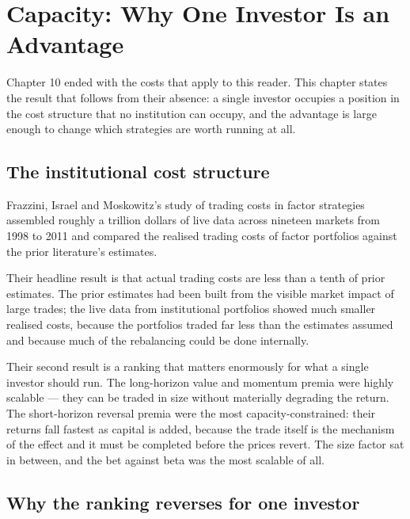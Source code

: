 
\chapter{Capacity: Why One Investor Is an Advantage}
\label{ch:capacity}

Chapter 10 ended with the costs that apply to this reader. This chapter
states the result that follows from their absence: a single investor
occupies a position in the cost structure that no institution can occupy,
and the advantage is large enough to change which strategies are worth
running at all.

\section{The institutional cost structure}

Frazzini, Israel and Moskowitz's study of trading costs in factor
strategies assembled roughly a trillion dollars of live data across
nineteen markets from 1998 to 2011 and compared the realised trading costs
of factor portfolios against the prior literature's estimates.

Their headline result is that actual trading costs are less than a tenth
of prior estimates. The prior estimates had been built from the visible
market impact of large trades; the live data from institutional portfolios
showed much smaller realised costs, because the portfolios traded far less
than the estimates assumed and because much of the rebalancing could be
done internally.

Their second result is a ranking that matters enormously for what a single
investor should run. The long-horizon value and momentum premia were
highly scalable --- they can be traded in size without materially
degrading the return. The short-horizon reversal premia were the most
capacity-constrained: their returns fall fastest as capital is added,
because the trade itself is the mechanism of the effect and it must be
completed before the prices revert. The size factor sat in between, and
the bet against beta was the most scalable of all.

\section{Why the ranking reverses for one investor}

